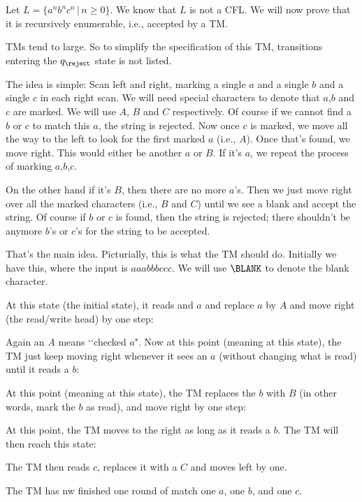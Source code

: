\begin{eg}
Let $L = \{a^n b^n c^n \,|\, n \geq 0\}$. We know that $L$ is not
a CFL. We will now prove that it is recursively enumerable, i.e.,
accepted by a TM.

TMs tend to large. So to simplify the specification of this TM,
transitions entering the $q_{\reject}$ state is not listed.

The idea is simple: Scan left and right, marking a single $a$ and
a single $b$ and a single $c$ in each right scan. We will need
special characters to denote that $a$,$b$ and $c$ are marked. We
will use $A$, $B$ and $C$ respectively. Of course if we cannot
find a $b$ or $c$ to match this $a$, the string is rejected. Now
once $c$ is marked, we move all the way to the left to look for
the first marked $a$ (i.e., $A$). Once that's found, we move
right. This would either be another $a$ or $B$. If it's $a$, we
repeat the process of marking $a$,$b$,$c$.

On the other hand if it's $B$, then there are no more $a$'s. Then
we just move right over all the marked characters (i.e., $B$ and
$C$) until we see a blank and accept the string. Of course if $b$
or $c$ is found, then the string is rejected; there shouldn't be
anymore $b$'s or $c$'s for the string to be accepted.

That's the main idea.
Picturially, this is what the TM should do.
Initially we have this, where the input is $aaabbbccc$.
We will use $\BLANK$ to denote the blank character.



At this state (the initial state), it reads and $a$ and replace $a$ by $A$
and move right (the read/write head) by one step:


Again an $A$ means \lq\lq checked $a$".
Now at this point (meaning at this state),
the TM just keep moving right whenever it sees an $a$ (without changing what is read)
until it reads a $b$:


At this point (meaning at this state), the TM replaces the $b$ with $B$ (in other words,
mark the $b$ as read), and move right by one step:


At this point, the TM moves to the right as long as it reads a $b$.
The TM will then reach this state:


The TM then reads $c$, replaces it with a $C$ and moves left by one.


The TM has nw finished one round of match one $a$, one $b$, and one $c$.


\end{eg}
